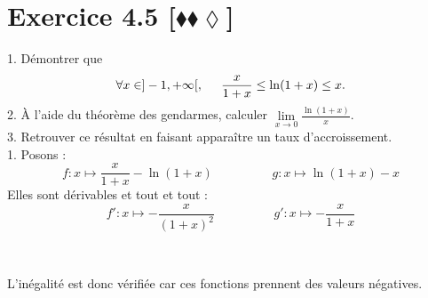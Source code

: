 \documentclass[10pt]{article}
\begin{document}
\section*{Exercice 4.5 [$\blacklozenge\blacklozenge\lozenge$]}
\begin{tcolorbox}[enhanced, width=7in, center, size=fbox, fontupper=\large, drop shadow southwest]
    1. Démontrer que
    \begin{equation*}
        \forall x\in]-1,+\infty[, \hspace{0.5cm} \frac{x}{1+x}\leq\ln(1+x)\leq x.
    \end{equation*}
    2. À l'aide du théorème des gendarmes, calculer $\lim\limits_{x\rightarrow0}{\frac{\ln(1+x)}{x}}$.\\
    3. Retrouver ce résultat en faisant apparaître un taux d'accroissement.\\[0.25cm]
    1. Posons :
    \begin{equation*}
        f:x\mapsto\frac{x}{1+x}-\ln(1+x) \hspace{2cm} g:x\mapsto\ln(1+x)-x
    \end{equation*}
    Elles sont dérivables et tout et tout :
    \begin{equation*}
        f':x\mapsto-\frac{x}{(1+x)^2} \hspace{2cm} g':x\mapsto-\frac{x}{1+x}
    \end{equation*}
    \begin{center}
        \\[0.25cm]
    \end{center}
    L'inégalité est donc vérifiée car ces fonctions prennent des valeurs négatives.
\end{tcolorbox}
\end{document}
